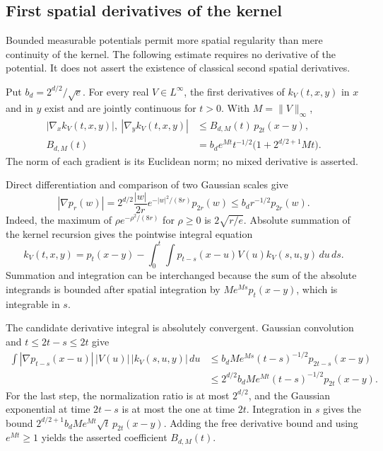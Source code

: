 \subsection{First spatial derivatives of the kernel}
Bounded measurable potentials permit more spatial regularity than mere
continuity of the kernel. The following estimate requires no derivative
of the potential. It does not assert the existence of classical second
spatial derivatives.

\begin{proposition}
\label{prop:schrodinger_kernel_gradient}
Put $b_d=2^{d/2}/\sqrt e$. For every real $V\in L^\infty$,
the first derivatives of $k_V(t,x,y)$ in $x$ and in $y$ exist and are
jointly continuous for $t>0$. With $M=\|V\|_\infty$,
\[
\begin{split}
|\nabla_x k_V(t,x,y)|,
\ |\nabla_y k_V(t,x,y)|
&\leq B_{d,M}(t)\,p_{2t}(x-y),\\
B_{d,M}(t)
&=b_d e^{Mt}t^{-1/2}\bigl(1+2^{d/2+1}Mt\bigr).
\end{split}
\]
The norm of each gradient is its Euclidean norm; no mixed derivative
is asserted.
\end{proposition}
\Proof
Direct differentiation and comparison of two Gaussian scales give
\[
|\nabla p_r(w)|
=2^{d/2}\frac{|w|}{2r}e^{-|w|^2/(8r)}p_{2r}(w)
\leq b_d r^{-1/2}p_{2r}(w).
\]
Indeed, the maximum of $\rho e^{-\rho^2/(8r)}$ for $\rho\geq0$
is $2\sqrt{r/e}$. Absolute summation of the kernel recursion gives
the pointwise integral equation
\[
k_V(t,x,y)=p_t(x-y)
-\int_0^t\int p_{t-s}(x-u)V(u)k_V(s,u,y)\,du\,ds.
\]
Summation and integration can be interchanged because the sum of the
absolute integrands is bounded after spatial integration by
$M e^{Ms}p_t(x-y)$, which is integrable in $s$.

The candidate derivative integral is absolutely convergent. Gaussian
convolution and $t\leq2t-s\leq2t$ give
\[
\begin{split}
\int |\nabla p_{t-s}(x-u)|\,|V(u)|\,|k_V(s,u,y)|\,du
&\leq b_d M e^{Ms}(t-s)^{-1/2}p_{2t-s}(x-y)\\
&\leq 2^{d/2}b_d M e^{Mt}(t-s)^{-1/2}p_{2t}(x-y).
\end{split}
\]
For the last step, the normalization ratio is at most $2^{d/2}$,
and the Gaussian exponential at time $2t-s$ is at most the one at
time $2t$. Integration in $s$ gives the bound
$2^{d/2+1}b_d M e^{Mt}\sqrt t\,p_{2t}(x-y)$.
Adding the free derivative bound and using $e^{Mt}\geq1$ yields
the asserted coefficient $B_{d,M}(t)$.

